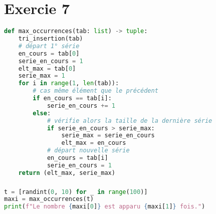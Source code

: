 \documentclass[svgnames,11pt]{beamer}
\begin{document}
\section{Exercie 7}
\begin{frame}[fragile]

\begin{center}
\begin{lstlisting}[language=Python , basicstyle=\ttfamily\small, xleftmargin=0.2em, xrightmargin=-3em]
def max_occurrences(tab: list) -> tuple:
    tri_insertion(tab)
    # départ 1° série
    en_cours = tab[0]
    serie_en_cours = 1
    elt_max = tab[0]
    serie_max = 1
    for i in range(1, len(tab)):
        # cas même élément que le précédent
        if en_cours == tab[i]:
            serie_en_cours += 1
        else:
            # vérifie alors la taille de la dernière série
            if serie_en_cours > serie_max:
                serie_max = serie_en_cours
                elt_max = en_cours
            # départ nouvelle série
            en_cours = tab[i]
            serie_en_cours = 1
    return (elt_max, serie_max)
\end{lstlisting}
\end{center} 

\end{frame}
\begin{frame}[fragile]
    \frametitle{}

\begin{center}
\begin{lstlisting}[language=Python , basicstyle=\ttfamily\small, xleftmargin=0.2em, xrightmargin=-2em]
t = [randint(0, 10) for _ in range(100)]
maxi = max_occurrences(t)
print(f"Le nombre {maxi[0]} est apparu {maxi[1]} fois.")
\end{lstlisting}
\end{center}

\end{frame}
\end{document}
